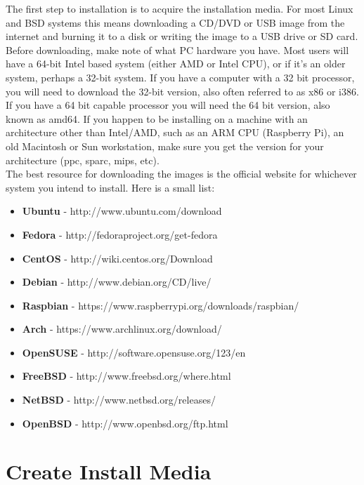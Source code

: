The first step to installation is to acquire the installation media.  For most Linux and BSD systems this means downloading a CD/DVD or USB image from the internet and burning it to a disk or writing the image to a USB drive or SD card.\\

Before downloading, make note of what PC hardware you have.  Most users will have a 64-bit Intel based system (either AMD or Intel CPU), or if it's an older system, perhaps a 32-bit system.  If you have a computer with a 32 bit processor, you will need to download the 32-bit version, also often referred to as x86 or i386.  If you have a 64 bit capable processor you will need the 64 bit version, also known as amd64.  If you happen to be installing on a machine with an architecture other than Intel/AMD, such as an ARM CPU (Raspberry Pi), an old Macintosh or Sun workstation, make sure you get the version for your architecture (ppc, sparc, mips, etc).\\

The best resource for downloading the images is the official website for whichever system you intend to install. Here is a small list:\\

\begin{itemize}

\item
\textbf{Ubuntu} - http://www.ubuntu.com/download
\item
\textbf{Fedora} - http://fedoraproject.org/get-fedora
\item
\textbf{CentOS} - http://wiki.centos.org/Download
\item
\textbf{Debian} - http://www.debian.org/CD/live/
\item
\textbf{Raspbian} - https://www.raspberrypi.org/downloads/raspbian/
\item
\textbf{Arch} - https://www.archlinux.org/download/
\item
\textbf{OpenSUSE} - http://software.opensuse.org/123/en
\item
\textbf{FreeBSD} - http://www.freebsd.org/where.html
\item
\textbf{NetBSD} - http://www.netbsd.org/releases/
\item
\textbf{OpenBSD} - http://www.openbsd.org/ftp.html

\end{itemize}

\section{Create Install Media}

